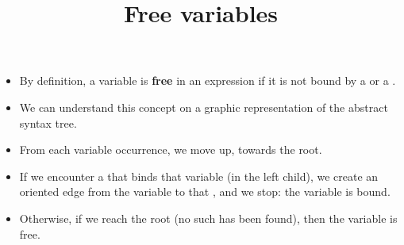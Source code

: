 \documentclass[wide]{slides}
\begin{document}
\begin{slide}
  \title{Free variables}

  \begin{itemize}


    \item By definition, a variable is \textbf{free} in an expression if
      it is not bound by a \Xlet or a \Xfun.

    \item We can understand this concept on a graphic representation
      of the abstract syntax tree.

    \item From each variable occurrence, we move up, towards the
      root.

    \item If we encounter a \Xlet that binds that variable (in the
      left child), we create an oriented edge from the variable to
      that \Xlet, and we stop: the variable is bound.

    \item Otherwise, if we reach the root (no such \Xlet has been
      found), then the variable is free.

  \end{itemize}

\end{slide}
\end{document}
